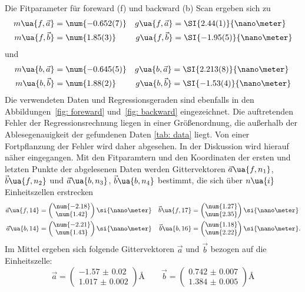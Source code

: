 Die Fitparameter für foreward (f) und backward (b) Scan ergeben sich zu
\begin{align}
  m\ua{f, \vec{a}} &= \num{-0.652(7)} & g\ua{f, \vec{a}} &= \SI{2.44(1)}{\nano\meter} \\
  m\ua{f, \vec{b}} &= \num{1.85(3)} & g\ua{f, \vec{b}} &= \SI{-1.95(5)}{\nano\meter}
\end{align}
und
\begin{align}
  m\ua{b, \vec{a}} &= \num{-0.645(5)} & g\ua{b, \vec{a}} &= \SI{2.213(8)}{\nano\meter} \\
  m\ua{b, \vec{b}} &= \num{1.88(2)}   & g\ua{b, \vec{b}} &= \SI{-1.53(4)}{\nano\meter}
\end{align}
Die verwendeten Daten und Regressionsgeraden sind ebenfalls in den Abbildungen~\ref{fig: foreward}
und~\ref{fig: backward} eingezeichnet.
Die auftretenden Fehler der Regressionsrechnung liegen in einer Größenordnung, die außerhalb der Ablesegenauigkeit der
gefundenen Daten \ref{tab: data} liegt. Von einer Fortpflanzung der Fehler wird daher abgesehen. In der Diskussion
wird hierauf näher eingegangen.
Mit den Fitparamtern und den Koordinaten der ersten und letzten Punkte der abgelesenen Daten werden Gittervektoren $\vec{a}\ua{f, n_1}$, $\vec{b}\ua{f, n_2}$ und
$\vec{a}\ua{b, n_3}$, $\vec{b}\ua{b, n_4}$ bestimmt, die sich über $n\ua{i}$ Einheitszellen erstrecken
\begin{align}
  \vec{a}\ua{f, 14} &= \begin{pmatrix} \num{-2.18} \\  \num{1.42} \end{pmatrix}\si{\nano\meter} & \vec{b}\ua{f, 17}   &= \begin{pmatrix} \num{1.27} \\ \num{2.35} \end{pmatrix} \si{\nano\meter}\\
  \vec{a}\ua{b, 14} &= \begin{pmatrix}  \num{-2.21} \\ \num{1.43} \end{pmatrix}\si{\nano\meter} &  \vec{b}\ua{b, 16} &= \begin{pmatrix} \num{1.18} \\ \num{2.22} \end{pmatrix} \si{\nano\meter}.
\end{align}
Im Mittel ergeben sich folgende Gittervektoren $\vec{a}$ und $\vec{b}$ bezogen auf die Einheitszelle:
\begin{equation}
  \vec{a} = \begin{pmatrix} \num{-1.57(2)} \\  \num{1.017(2)} \end{pmatrix}\si{\angstrom} \qquad
  \vec{b} = \begin{pmatrix} \num{0.742(7)} \\  \num{1.384(5)} \end{pmatrix}\si{\angstrom}
\end{equation}
